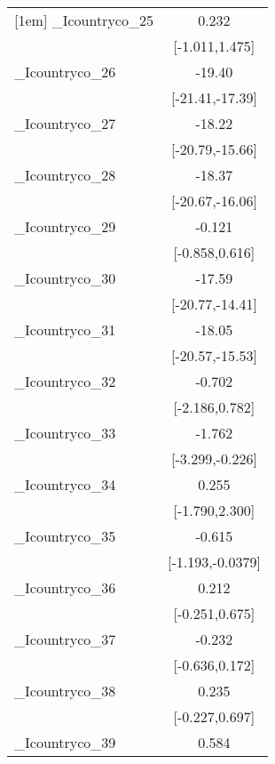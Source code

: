 {\begin{tabular}{l*{1}{c}}
[1em]
\_Icountryco\_25&                 0.232         \\
            &        [-1.011,1.475]         \\
[1em]
\_Icountryco\_26&                -19.40\sym{***}\\
            &       [-21.41,-17.39]         \\
[1em]
\_Icountryco\_27&                -18.22\sym{***}\\
            &       [-20.79,-15.66]         \\
[1em]
\_Icountryco\_28&                -18.37\sym{***}\\
            &       [-20.67,-16.06]         \\
[1em]
\_Icountryco\_29&                -0.121         \\
            &        [-0.858,0.616]         \\
[1em]
\_Icountryco\_30&                -17.59\sym{***}\\
            &       [-20.77,-14.41]         \\
[1em]
\_Icountryco\_31&                -18.05\sym{***}\\
            &       [-20.57,-15.53]         \\
[1em]
\_Icountryco\_32&                -0.702         \\
            &        [-2.186,0.782]         \\
[1em]
\_Icountryco\_33&                -1.762\sym{*}  \\
            &       [-3.299,-0.226]         \\
[1em]
\_Icountryco\_34&                 0.255         \\
            &        [-1.790,2.300]         \\
[1em]
\_Icountryco\_35&                -0.615\sym{*}  \\
            &      [-1.193,-0.0379]         \\
[1em]
\_Icountryco\_36&                 0.212         \\
            &        [-0.251,0.675]         \\
[1em]
\_Icountryco\_37&                -0.232         \\
            &        [-0.636,0.172]         \\
[1em]
\_Icountryco\_38&                 0.235         \\
            &        [-0.227,0.697]         \\
[1em]
\_Icountryco\_39&                 0.584         \\

\end{tabular}}
